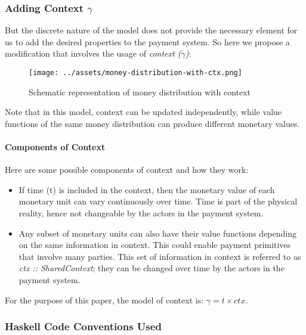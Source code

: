 \subsubsection{Adding Context $\gamma$}

But the discrete nature of the model does not provide the necessary element for us to add the
desired properties to the payment system. So here we propose a modification that involves the usage
of \textit{context ($\gamma$)}:

\begin{figure}[h]
    \centering
    \texttt{[image: ../assets/money-distribution-with-ctx.png]}
    \caption{Schematic representation of money distribution with context}
    \label{fig:md-with-ctx}
\end{figure}

Note that in this model, context can be updated independently, while value functions of the same
money distribution can produce different monetary values.

\paragraph{Components of Context}

Here are some possible components of context and how they work:

\begin{itemize}
    \item If time (t) is included in the context, then the monetary value of each monetary unit can
vary continuously over time. Time is part of the physical reality, hence not changeable by the
actors in the payment system.

    \item Any subset of monetary units can also have their value functions depending on the same
information in context. This could enable payment primitives that involve many parties. This set of
information in context is referred to as \textit{ctx :: SharedContext}; they can be changed over
time by the actors in the payment system.
\end{itemize}

For the purpose of this paper, the model of context is: $\gamma = t \times ctx$.

\subsubsection{Haskell Code Conventions Used}

